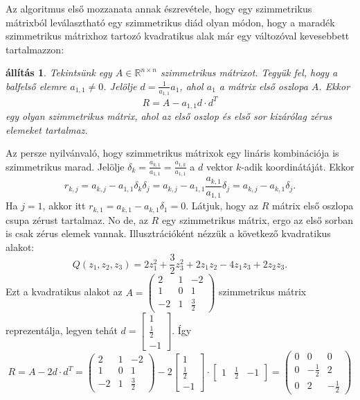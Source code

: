 \documentclass[9pt, a4paper, showtrims]{memoir}
\makeatletter
\renewenvironment{proof}[1][\proofname]
    {\par\pushQED{\qed}%
    \normalfont \topsep6\p@\@plus6\p@\relax
    \trivlist
    \item[\hskip\labelsep
        \itshape
    #1\@addpunct{:}]\ignorespaces}
    {\popQED\endtrivlist\@endpefalse}
\theoremstyle{plain}
\newtheorem{proposition}{állítás}[chapter]
\theoremstyle{remark}
\theoremstyle{definition}
\makeatother
\begin{document}
Az algoritmus első mozzanata annak észrevétele, 
hogy egy szimmetrikus mátrixból leválasztható egy szimmetrikus diád olyan módon,
hogy a maradék szimmetrikus mátrixhoz tartozó kvadratikus alak már egy változóval kevesebbett tartalmazzon:
\begin{proposition}
    Tekintsünk egy $A\in\mathbb{R}^{n\times n}$ szimmetrikus mátrixot.
    Tegyük fel, hogy a balfelső elemre $a_{1,1}\neq 0$.
    Jelölje $d=\frac{1}{a_{1,1}}a_1$, ahol $a_1$ a mátrix első oszlopa $A$.
    Ekkor
    \[
        R=A-a_{1,1}d\cdot d^T
   \]
   egy olyan szimmetrikus mátrix, 
   ahol az első oszlop és első sor kizárólag zérus elemeket tartalmaz.
\end{proposition}
\begin{proof}
    Az persze nyilvánvaló, hogy szimmetrikus mátrixok egy lináris kombinációja is szimmetrikus marad.
    Jelölje $\delta_k=\frac{a_{k,1}}{a_{1,1}}=\frac{a_{1,k}}{a_{1,1}}$ a $d$ vektor $k$-adik koordinátáját.
    Ekkor 
    \[
        r_{k,j}=
        a_{k,j}-a_{1,1}\delta_k\delta_j=
        a_{k,j}-a_{1,1}\frac{a_{k,1}}{a_{1,1}}\delta_j=
        a_{k,j}-a_{k,1}\delta_j.
        \tag{\dag}
    \]
    Ha $j=1$, akkor itt $r_{k,1}=a_{k,1}-a_{k,1}\delta_1=0$.
    Látjuk, hogy az $R$ mátrix első oszlopa csupa zérust tartalmaz. 
    No de, az $R$ egy szimmetrikus mátrix, ergo az első sorban is csak zérus elemek vannak.
    \end{proof}
    Illusztrációként nézzük a következő kvadratikus alakot:
    \[
        Q\left( z_1,z_2,z_3 \right)
        =
        2z_1^2+\frac{3}{2}z_3^2+2z_1z_2-4z_1z_3+2z_2z_3.
    \]
    Ezt a kvadratikus alakot az 
    \(A=
    \begin{pmatrix}
        2&1&-2\\
        1&0&1\\
        -2&1&\frac{3}{2}
    \end{pmatrix}
    \)
    szimmetrikus mátrix reprezentálja, 
    legyen tehát 
    \(d=
    \begin{bmatrix}
        1\\ \frac{1}{2}\\ -1
    \end{bmatrix}.
    \)
    Így 
    \[
        R=A-2d\cdot d^T
        =
        \begin{pmatrix}
        2&1&-2\\
        1&0&1\\
        -2&1&\frac{3}{2}
        \end{pmatrix}
        -2
        \begin{bmatrix}
        1\\ \frac{1}{2}\\ -1
        \end{bmatrix}
        \cdot
        \begin{bmatrix}
        1& \frac{1}{2}& -1
        \end{bmatrix}
        =
        \begin{pmatrix}
            0&0&0\\
            0&-\frac{1}{2}&2\\
            0&2&-\frac{1}{2}
        \end{pmatrix}
    \]
\end{document}
